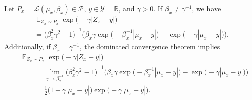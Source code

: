 \documentclass{article}
\DeclareMathOperator{\Exp}{\mathbb{E}}
\begin{document}
Let $P_x = \mathcal{L}(\mu_x, \beta_x) \in \mathcal{P}$, $y \in \mathcal{Y} = \mathbb{R}$,
and $\gamma > 0$. If $\beta_x \neq \gamma^{-1}$, we have
\begin{multline*}
    \Exp_{Z_x \sim P_x} \exp{\big(- \gamma |Z_x - y|\big)}
    \\
    = {\big(\beta_x^2 \gamma^2 - 1\big)}^{-1} \Big(\beta_x \gamma
    \exp{\big(-\beta_x^{-1} |\mu_x - y| \big)} - \exp{\big(-\gamma |\mu_x-y| \big)}\Big).
\end{multline*}
Additionally, if $\beta_x = \gamma^{-1}$, the dominated convergence theorem implies
\begin{equation*}
    \begin{split}
        &\Exp_{Z_x \sim P_x} \exp{\big(-\gamma |Z_x - y| \big)} \\
        &\qquad = \lim_{\gamma \to \beta_x^{-1}} {\big(\beta_x^2 \gamma^2 - 1\big)}^{-1} \Big(\beta_x \gamma
        \exp{\big(-\beta_x^{-1}|\mu_x-y|\big)} - \exp{\big(-\gamma|\mu_x - y|\big)}\Big) \\
        &\qquad = \frac{1}{2}\big(1 + \gamma |\mu_x - y|\big)\exp{\big(-\gamma |\mu_x-y|\big)}.
    \end{split}
\end{equation*}
\end{document}
